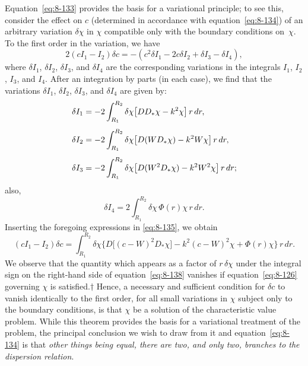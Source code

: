 Equation~\eqref{eq:8-133} provides the basis for a variational principle; to see this, consider the effect on $c$ (determined in accordance with equation~\eqref{eq:8-134}) of an arbitrary variation $\delta\chi$ in $\chi$ compatible only with the boundary conditions on~$\chi$. To the first order in the variation, we have
\begin{equation}
\label{eq:8-135}
2(cI_1 - I_2)\delta c = -(c^2\delta I_1 - 2c\delta I_2 + \delta I_3 - \delta I_4),
\end{equation}
where $\delta I_1$, $\delta I_2$, $\delta I_3$, and $\delta I_4$ are the corresponding variations in the integrals $I_1$, $I_2$, $I_3$, and $I_4$. After an integration by parts (in each case), we find that the variations $\delta I_1$, $\delta I_2$, $\delta I_3$, and $\delta I_4$ are given by:
\begin{align}
\label{eq:8-136}
\delta I_1 &= -2\int_{R_1}^{R_2}\delta\chi\bigl[DD_*\chi - k^2\chi\bigr]\,r\,dr, \notag\\[4pt]
\delta I_2 &= -2\int_{R_1}^{R_2}\delta\chi\bigl[D(WD_*\chi) - k^2 W\chi\bigr]\,r\,dr, \notag\\[4pt]
\delta I_3 &= -2\int_{R_1}^{R_2}\delta\chi\bigl[D(W^2 D_*\chi) - k^2 W^2\chi\bigr]\,r\,dr;
\end{align}
also,
\begin{equation}
\label{eq:8-137}
\delta I_4 = 2\int_{R_1}^{R_2}\delta\chi\,\Phi(r)\chi\,r\,dr.
\end{equation}
Inserting the foregoing expressions in \eqref{eq:8-135}, we obtain
\begin{equation}
\label{eq:8-138}
(cI_1-I_2)\delta c = \int_{R_1}^{R_2}\delta\chi\bigl\{D\bigl[(c-W)^2 D_*\chi\bigr] - k^2(c-W)^2\chi + \Phi(r)\chi\bigr\}\,r\,dr.
\end{equation}
We observe that the quantity which appears as a factor of $r\,\delta\chi$ under the integral sign on the right-hand side of equation~\eqref{eq:8-138} vanishes if equation~\eqref{eq:8-126} governing $\chi$ is satisfied.$\dagger$ Hence, a necessary and sufficient condition for $\delta c$ to vanish identically to the first order, for all small variations in $\chi$ subject only to the boundary conditions, is that $\chi$ be a solution of the characteristic value problem. While this theorem provides the basis for a variational treatment of the problem, the principal conclusion we wish to draw from it and equation~\eqref{eq:8-134} is that \emph{other things being equal, there are two, and only two, branches to the dispersion relation}.

